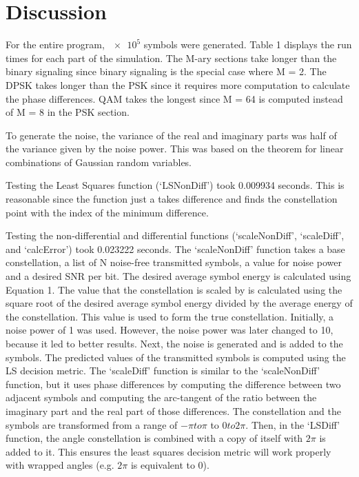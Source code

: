 \documentclass[12pt]{report}
\newcommand\tab[1][1cm]{\hspace*{#1}}               %
\begin{document}
\newpage

\section{Discussion}

\tab For the entire program, $\num{e5}$ symbols were generated. Table 1 displays the run times for each part of the simulation. The M-ary sections take longer than the binary signaling since binary signaling is the special case where M = 2. The DPSK takes longer than the PSK since it requires more computation to calculate the phase differences. QAM takes the longest since M = 64 is computed instead of M = 8 in the PSK section.

\quad To generate the noise, the variance of the real and imaginary parts was half of the variance given by the noise power. This was based on the theorem for linear combinations of Gaussian random variables.

\quad Testing the Least Squares function (`LSNonDiff') took 0.009934 seconds. This is reasonable since the function just a takes difference and finds the constellation point with the index of the minimum difference.

\quad Testing the non-differential and differential functions (`scaleNonDiff', `scaleDiff', and `calcError') took 0.023222 seconds. The `scaleNonDiff' function takes a base constellation, a list of N noise-free transmitted symbols, a value for noise power and a desired SNR per bit. The desired average symbol energy is calculated using Equation 1. The value that the constellation is scaled by is calculated using the square root of the desired average symbol energy divided by the average energy of the constellation. This value is used to form the true constellation. Initially, a noise power of 1 was used. However, the noise power was later changed to 10, because it led to better results. Next, the noise is generated and is added to the symbols. The predicted values of the transmitted symbols is computed using the LS decision metric. The `scaleDiff' function is similar to the `scaleNonDiff' function, but it uses phase differences by computing the difference between two adjacent symbols and computing the arc-tangent of the ratio between the imaginary part and the real part of those differences. The constellation and the symbols are transformed from a range of $-\pi to \pi$ to $0 to 2\pi$. Then, in the `LSDiff' function, the angle constellation is combined with a copy of itself with $2\pi$ is added to it. This ensures the least squares decision metric will work properly with wrapped angles (e.g. $2\pi$ is equivalent to 0).
\end{document}
